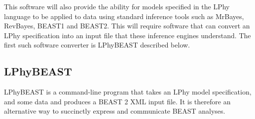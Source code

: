 \documentclass[11pt]{article}
\begin{document}
This software will also provide the ability for models specified in the LPhy language to be applied to data using standard inference tools such as MrBayes, RevBayes, BEAST1 and BEAST2. This will require software that can convert an LPhy specification into an input file that these inference engines understand. The first such software converter is LPhyBEAST described below.

\subsection{LPhyBEAST}

LPhyBEAST is a command-line program that takes an LPhy model specification, and some data and produces a BEAST 2 XML input file.
It is therefore an alternative way to succinctly express and communicate BEAST analyses.
\end{document}

